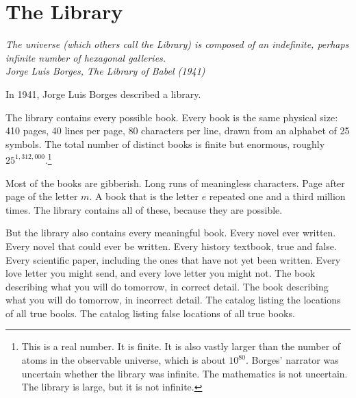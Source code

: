 \chapter{The Library}

\vspace{1em}
\hfill
\begin{minipage}[c]{0.55\textwidth}
\raggedleft
\small\itshape
The universe (which others call the Library) is composed of an indefinite, perhaps infinite number of hexagonal galleries.\\[0.5em]
\upshape\footnotesize Jorge Luis Borges, \textit{The Library of Babel} (1941)
\end{minipage}%
\hspace{0.5em}
\begin{minipage}[c]{0.12\textwidth}
\end{minipage}
\vspace{1.5em}

\noindent In 1941, Jorge Luis Borges described a library.

The library contains every possible book. Every book is the same physical size: 410 pages, 40 lines per page, 80 characters per line, drawn from an alphabet of 25 symbols. The total number of distinct books is finite but enormous, roughly $25^{1{,}312{,}000}$.\footnote{This is a real number. It is finite. It is also vastly larger than the number of atoms in the observable universe, which is about $10^{80}$. Borges' narrator was uncertain whether the library was infinite. The mathematics is not uncertain. The library is large, but it is not infinite.}

Most of the books are gibberish. Long runs of meaningless characters. Page after page of the letter $m$. A book that is the letter $e$ repeated one and a third million times. The library contains all of these, because they are possible.

But the library also contains every meaningful book. Every novel ever written. Every novel that could ever be written. Every history textbook, true and false. Every scientific paper, including the ones that have not yet been written. Every love letter you might send, and every love letter you might not. The book describing what you will do tomorrow, in correct detail. The book describing what you will do tomorrow, in incorrect detail. The catalog listing the locations of all true books. The catalog listing false locations of all true books.

